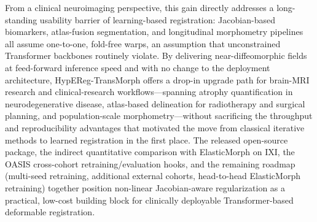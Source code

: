 \documentclass[jimaging,article,submit,pdftex,moreauthors]{Definitions/mdpi}
\begin{document}
From a clinical neuroimaging perspective, this gain directly addresses a long-standing usability barrier of learning-based registration: Jacobian-based biomarkers, atlas-fusion segmentation, and longitudinal morphometry pipelines all assume one-to-one, fold-free warps, an assumption that unconstrained Transformer backbones routinely violate. By delivering near-diffeomorphic fields at feed-forward inference speed and with no change to the deployment architecture, HypEReg-TransMorph offers a drop-in upgrade path for brain-MRI research and clinical-research workflows---spanning atrophy quantification in neurodegenerative disease, atlas-based delineation for radiotherapy and surgical planning, and population-scale morphometry---without sacrificing the throughput and reproducibility advantages that motivated the move from classical iterative methods to learned registration in the first place. The released open-source package, the indirect quantitative comparison with ElasticMorph on IXI, the OASIS cross-cohort retraining/evaluation hooks, and the remaining roadmap (multi-seed retraining, additional external cohorts, head-to-head ElasticMorph retraining) together position non-linear Jacobian-aware regularization as a practical, low-cost building block for clinically deployable Transformer-based deformable registration.

\vspace{6pt} 



\end{document}
